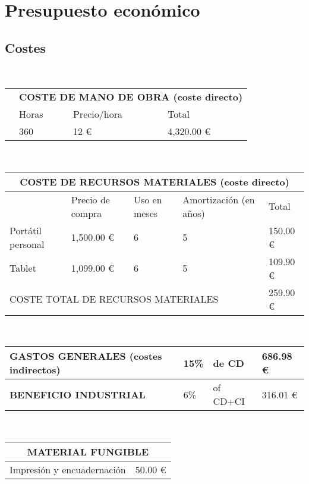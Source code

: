 \chapter{Presupuesto económico} \label{chap:economic}

\section{Costes}

\ \hfill
\begin{tabular}{ p{5.5cm}|p{2.7cm}|p{2.7cm}|p{2cm}|  }
	\cline{2-4}
	& \multicolumn{3}{|c|}{\textbf{COSTE DE MANO DE OBRA (coste directo)}} \\
	\cline{2-4}
	& Horas & Precio/hora & Total \\
	\cline{2-4}
	& 360 & \hfill 12 \euro & \hfill 4,320.00 \euro \\
	\cline{2-4}
\end{tabular}

\vspace{1cm}

\ \hfill
\begin{tabular}{ |p{3cm}| *{4}{p{2.1cm}|}  }
	\hline
	\multicolumn{5}{|c|}{\textbf{COSTE DE RECURSOS MATERIALES (coste directo)}} \\
	\hline
	& Precio de compra & Uso en meses & Amortización (en años) & Total \\
	\hline
	Portátil personal & \hfill 1,500.00 \euro & 6 & 5 & \hfill 150.00 \euro \\
	\hline
	Tablet & \hfill 1,099.00 \euro & 6 & 5 & \hfill 109.90 \euro \\
	\hline
	\multicolumn{4}{|l|}{COSTE TOTAL DE RECURSOS MATERIALES} & \hfill 259.90 \euro \\
	\hline
\end{tabular}

\vspace{1cm}

\ \hfill
\begin{tabular}{ |p{8.4cm}|p{0.8cm}|p{2.1cm}|p{2cm}| }
	\hline
	\textbf{GASTOS GENERALES (costes indirectos)} & 15\% & de CD & \hfill 686.98 \euro \\
	\hline
	\textbf{BENEFICIO INDUSTRIAL} & 6\% & of CD+CI & \hfill 316.01 \euro \\
	\hline
\end{tabular}

\vspace{1cm}

\ \hfill
\begin{tabular}{ |p{5cm}|p{2cm}|  }
	\hline
	\multicolumn{2}{|c|}{\textbf{MATERIAL FUNGIBLE}} \\
	\hline
	Impresión y encuadernación & \hfill 50.00 \euro \\
	\hline
\end{tabular}

